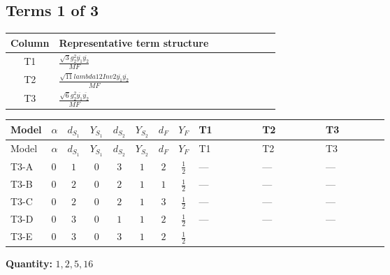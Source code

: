 \documentclass[8pt]{article}
\begin{document}
\begin{landscape}
\subsection*{Terms 1 of 3}
\begin{center}
\begin{tabular}{@{}c >{\raggedright\arraybackslash}p{0.82\linewidth}@{}}
\toprule
Column & Representative term structure \\
\midrule
T1 & \(\displaystyle \frac{\sqrt{3} g_{2}^{2} \overline{y_{1}} \overline{y_{2}}}{MF}\) \\
\midrule
T2 & \(\displaystyle \frac{\sqrt{11} lambda12Inv2 \overline{y_{1}} \overline{y_{2}}}{MF}\) \\
\midrule
T3 & \(\displaystyle \frac{\sqrt{6} g_{2}^{2} \overline{y_{1}} \overline{y_{2}}}{MF}\) \\
\midrule
\bottomrule
\end{tabular}
\end{center}
\smallskip
\tiny
\begin{longtable}{@{}llcccccc >{\raggedright\arraybackslash}p{0.21\linewidth} >{\raggedright\arraybackslash}p{0.21\linewidth} >{\raggedright\arraybackslash}p{0.21\linewidth}@{}}
\toprule
Model & $\alpha$ & $d_{S_1}$ & $Y_{S_1}$ & $d_{S_2}$ & $Y_{S_2}$ & $d_F$ & $Y_F$ & T1 & T2 & T3 \\
\midrule
\endfirsthead
\toprule
Model & $\alpha$ & $d_{S_1}$ & $Y_{S_1}$ & $d_{S_2}$ & $Y_{S_2}$ & $d_F$ & $Y_F$ & T1 & T2 & T3 \\
\midrule
\endhead
T3-A & $0$ & $1$ & $0$ & $3$ & $1$ & $2$ & $\frac{1}{2}$ & --- & --- & --- \\
\midrule
T3-B & $0$ & $2$ & $0$ & $2$ & $1$ & $1$ & $\frac{1}{2}$ & --- & --- & --- \\
\midrule
T3-C & $0$ & $2$ & $0$ & $2$ & $1$ & $3$ & $\frac{1}{2}$ & --- & --- & --- \\
\midrule
T3-D & $0$ & $3$ & $0$ & $1$ & $1$ & $2$ & $\frac{1}{2}$ & --- & --- & --- \\
\midrule
T3-E & $0$ & $3$ & $0$ & $3$ & $1$ & $2$ & $\frac{1}{2}$ & \scriptsize\adjustbox{max width=\linewidth}{$\begin{gathered} - \frac{15 \sqrt{3} g_{2}^{2} \overline{y_{1}} \overline{y_{2}}}{8 MF}\end{gathered}$} & \scriptsize\adjustbox{max width=\linewidth}{$\begin{gathered} - \frac{3 \sqrt{11} lambda12Inv2 \overline{y_{1}} \overline{y_{2}}}{22 MF}\end{gathered}$} & \scriptsize\adjustbox{max width=\linewidth}{$\begin{gathered} - \frac{\sqrt{6} g_{2}^{2} \overline{y_{1}} \overline{y_{2}}}{6 MF}\end{gathered}$} \\
\midrule
\bottomrule
\end{longtable}
\clearpage
\noindent\textbf{Quantity: }$\mathrm{1,2,5,16}$\par\smallskip

\end{landscape}
\end{document}
